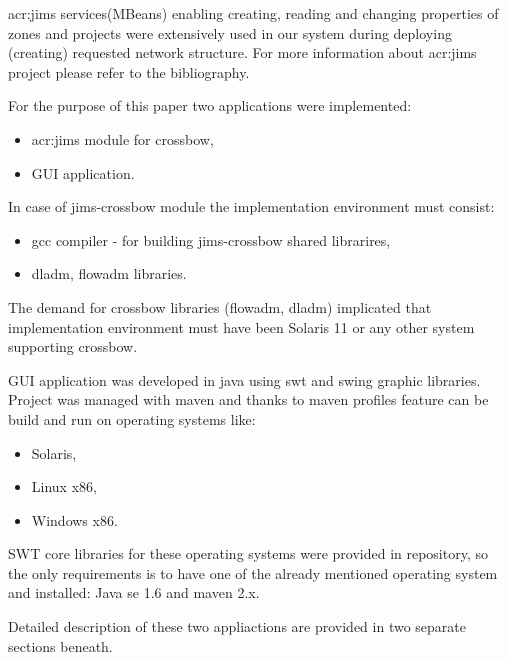 \documentclass[11pt]{book}
\begin{document}
      \gls{acr:jims} services(MBeans) enabling creating, reading and changing properties of zones and projects were extensively
      used in our system during deploying (creating) requested network structure. For more information about \gls{acr:jims}
      project please refer to the bibliography.	
    
      \medskip
	
      For the purpose of this paper two applications were implemented:
	
      \begin{itemize}
        \item \gls{acr:jims} module for crossbow,
        \item GUI application.
      \end{itemize}
	  
	  \medskip
	
      In case of jims-crossbow module the implementation environment must consist:

      \begin{itemize}
        \item gcc compiler - for building jims-crossbow shared librarires,
        \item dladm, flowadm libraries.
      \end{itemize}
	
      The demand for crossbow libraries (flowadm, dladm) implicated that implementation environment must have been
      Solaris 11 or any other system supporting crossbow.
    
      GUI application was developed in java using swt and swing graphic libraries. Project was managed with maven and
      thanks to maven profiles feature can be build and run on operating systems like:

      \begin{itemize}
        \item Solaris,
        \item Linux x86,
        \item Windows x86.
      \end{itemize}

      SWT core libraries for these operating systems were provided in repository, so the only requirements is to have
      one of the already mentioned operating system and installed: Java se 1.6 and maven 2.x.
	  
	  \medskip
	  
	  Detailed description of these two appliactions are provided in two separate sections beneath. 
	  
\end{document}
